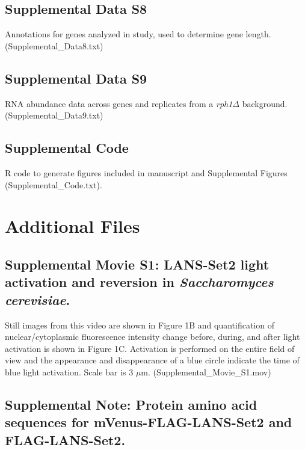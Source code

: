 \documentclass[11pt]{biorxiv}
\newcommand{\rphdelt}{\emph{rph1$\Delta$}\xspace}
\begin{document}
\subsection{Supplemental Data S8}

Annotations for genes analyzed in study, used to determine gene length. (Supplemental\_Data8.txt)

\subsection{Supplemental Data S9}

RNA abundance data across genes and replicates from a \rphdelt background. (Supplemental\_Data9.txt)

\subsection{Supplemental Code}

R code to generate figures included in manuscript and Supplemental Figures (Supplemental\_Code.txt).

\section{Additional Files}

\subsection{Supplemental Movie S1: LANS-Set2 light activation and reversion in \emph{Saccharomyces cerevisiae}.}

\noindent Still images from this video are shown in Figure 1B and quantification of nuclear/cytoplasmic fluorescence intensity change before, during, and after light activation is shown in Figure 1C. Activation is performed on the entire field of view and the appearance and disappearance of a blue circle indicate the time of blue light activation. Scale bar is 3 $\mu$m. (Supplemental\_Movie\_S1.mov)

\subsection{Supplemental Note: Protein amino acid sequences for mVenus-FLAG-LANS-Set2 and FLAG-LANS-Set2.}
\end{document}
